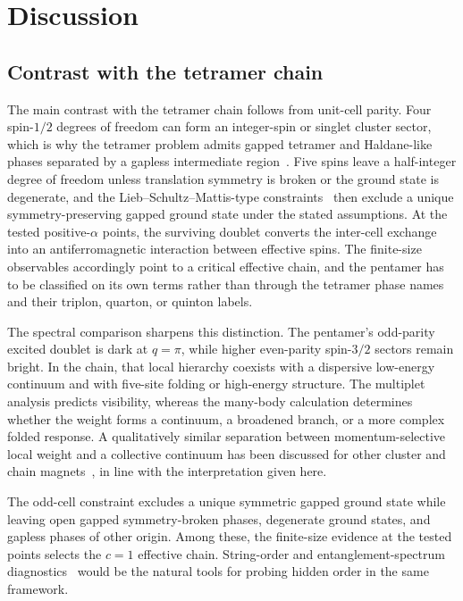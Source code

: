 \section{Discussion}
\label{sec:discussion}

\subsection{Contrast with the tetramer chain}

The main contrast with the tetramer chain follows from unit-cell parity.
Four spin-$1/2$ degrees of freedom can form an integer-spin or singlet cluster
sector, which is why the tetramer problem admits gapped tetramer and Haldane-like
phases separated by a gapless intermediate
region~\cite{li2026tetramer,gong2008tetramer}.
Five spins leave a half-integer degree of freedom unless translation symmetry is
broken or the ground state is degenerate, and the Lieb--Schultz--Mattis-type
constraints~\cite{lieb1961,ogata2019,affleck1987} then exclude a unique
symmetry-preserving gapped ground state under the stated assumptions.
At the tested positive-$\alpha$ points, the surviving doublet converts the
inter-cell exchange into an antiferromagnetic interaction between effective spins.
The finite-size observables accordingly point to a critical effective chain, and
the pentamer has to be classified on its own terms rather than through the
tetramer phase names and their triplon, quarton, or quinton labels.

The spectral comparison sharpens this distinction.
The pentamer's odd-parity excited doublet is dark at $q=\pi$, while higher
even-parity spin-$3/2$ sectors remain bright.
In the chain, that local hierarchy coexists with a dispersive low-energy continuum
and with five-site folding or high-energy structure.
The multiplet analysis predicts visibility, whereas the many-body calculation
determines whether the weight forms a continuum, a broadened branch, or a more
complex folded response.
A qualitatively similar separation between momentum-selective local weight and a
collective continuum has been discussed for other cluster and chain
magnets~\cite{keselman2020,gao2024srv3o9,bruognolo2016}, in line with the
interpretation given here.

The odd-cell constraint excludes a unique symmetric gapped ground state while
leaving open gapped symmetry-broken phases, degenerate ground states, and gapless
phases of other origin.
Among these, the finite-size evidence at the tested points selects the $c=1$
effective chain.
String-order and entanglement-spectrum
diagnostics~\cite{guwen2009,pollmann2010,pollmann2012,han2017bcfg} would be the
natural tools for probing hidden order in the same framework.

